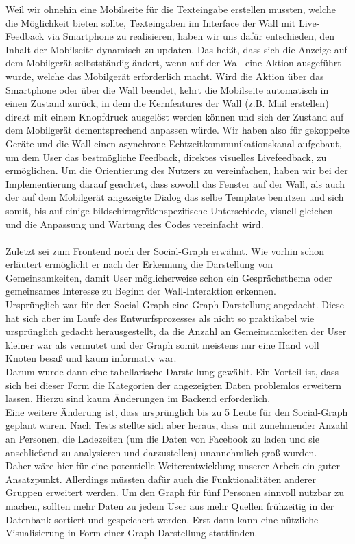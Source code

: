 \documentclass[10pt,a4paper]{report}
\begin{document}
	Weil wir ohnehin eine Mobilseite für die Texteingabe erstellen mussten, welche die Möglichkeit bieten sollte, Texteingaben im Interface der Wall mit Live-Feedback via Smartphone zu realisieren, haben wir uns dafür entschieden, den Inhalt der Mobilseite dynamisch zu updaten. Das heißt, dass sich die Anzeige auf dem Mobilgerät selbstständig ändert, wenn auf der Wall eine Aktion ausgeführt wurde, welche das Mobilgerät erforderlich macht. Wird die Aktion über das Smartphone oder über die Wall beendet, kehrt die Mobilseite automatisch in einen Zustand zurück, in dem die Kernfeatures der Wall (z.B. Mail erstellen) direkt mit einem Knopfdruck ausgelöst werden können und sich der Zustand auf dem Mobilgerät dementsprechend anpassen würde. Wir haben also für gekoppelte Geräte und die Wall einen asynchrone Echtzeitkommunikationskanal aufgebaut, um dem User das bestmögliche Feedback, direktes visuelles Livefeedback, zu ermöglichen. Um die Orientierung des Nutzers zu vereinfachen, haben wir bei der Implementierung darauf geachtet, dass sowohl das Fenster auf der Wall, als auch der auf dem Mobilgerät angezeigte Dialog das selbe Template benutzen und sich somit, bis auf einige bildschirmgrößenspezifische Unterschiede, visuell gleichen und die Anpassung und Wartung des Codes vereinfacht wird.\\\\
	Zuletzt sei zum Frontend noch der Social-Graph erwähnt. Wie vorhin schon erläutert ermöglicht er nach der Erkennung die Darstellung von Gemeinsamkeiten, damit User möglicherweise schon ein Gesprächsthema oder gemeinsames Interesse zu Beginn der Wall-Interaktion erkennen.\\
	Ursprünglich war für den Social-Graph eine Graph-Darstellung angedacht. Diese hat sich aber im Laufe des Entwurfsprozesses als nicht so praktikabel wie ursprünglich gedacht herausgestellt, da die Anzahl an Gemeinsamkeiten der User kleiner war als vermutet und der Graph somit meistens nur eine Hand voll Knoten besaß und kaum informativ war.\\
	Darum wurde dann eine tabellarische Darstellung gewählt. Ein Vorteil ist, dass sich bei dieser Form die Kategorien der angezeigten Daten problemlos erweitern lassen. Hierzu sind kaum Änderungen im Backend erforderlich.\\ 
	Eine weitere Änderung ist, dass ursprünglich bis zu 5 Leute für den Social-Graph geplant waren. Nach Tests stellte sich aber heraus, dass mit zunehmender Anzahl an Personen, die Ladezeiten (um die Daten von Facebook zu laden und sie anschließend zu analysieren und darzustellen) unannehmlich groß wurden.\\
Daher wäre hier für eine potentielle Weiterentwicklung unserer Arbeit ein guter Ansatzpunkt. Allerdings müssten dafür auch die Funktionalitäten anderer Gruppen erweitert werden. Um den Graph für fünf Personen sinnvoll nutzbar zu machen, sollten mehr Daten zu jedem User aus mehr Quellen frühzeitig in der Datenbank sortiert und gespeichert werden. Erst dann kann eine nützliche Visualisierung in Form einer Graph-Darstellung stattfinden.
\end{document}
